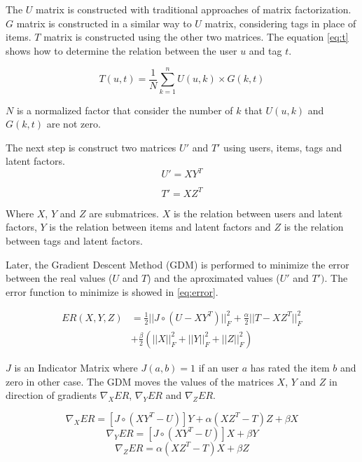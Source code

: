 \documentclass{sig-alternate}
\begin{document}
The $U$ matrix is constructed with traditional approaches of matrix factorization. $G$ matrix is constructed in a similar way to $U$ matrix, considering tags in place of items. $T$ matrix is constructed using the other two matrices. The equation \eqref{eq:t} shows how to determine the relation between the user $u$ and tag $t$.

\begin{equation}
\label{eq:t}
T(u,t) = \frac{1}{N} \sum_{k=1}^{n}U(u,k) \times G(k,t)
\end{equation}

$N$ is a normalized factor that consider the number of $k$ that $U(u,k)$ and $G(k,t)$ are not zero.

The next step is construct two matrices $U'$ and $T'$ using users, items, tags and latent factors.
\begin{equation}
\label{eq:u}
U' = XY^T
\end{equation} 

\begin{equation}
\label{eq:u}
T' = XZ^T
\end{equation} 

Where $X$, $Y$ and $Z$ are submatrices. $X$ is the relation between users and latent factors, $Y$ is the relation between items and latent factors and $Z$ is the relation between tags and latent factors.

Later, the Gradient Descent Method (GDM) is performed to minimize the error between the real values ($U$ and $T$) and the aproximated values ($U'$ and $T')$. The error function to minimize is showed in \eqref{eq:error}.

\begin{equation}
\label{eq:error}
\begin{aligned}
ER(X,Y,Z) &= \frac{1}{2}||J \circ (U-XY^T)||^{2}_{F}+\frac{\alpha}{2}||T-XZ^T||^{2}_{F}\\
&+\frac{\beta}{2}\left( ||X||^{2}_{F} + ||Y||^{2}_{F} + ||Z||^{2}_{F} \right)
\end{aligned}
\end{equation}

$J$ is an Indicator Matrix where $J(a,b)=1$ if an user $a$ has rated the item $b$ and zero in other case. The GDM moves the values of the matrices $X$, $Y$ and $Z$ in direction of gradients $\nabla_XER$, $\nabla_YER$ and $\nabla_ZER$.

\begin{equation}
\label{eq:gradientx}
\nabla_XER = \left[ J \circ (XY^T-U) \right] Y + \alpha (XZ^T-T)Z + \beta X
\end{equation}
\begin{equation}
\label{eq:gradienty}
\nabla_YER = \left[ J \circ (XY^T-U) \right] X + \beta Y
\end{equation}
\begin{equation}
\label{eq:gradientz}
\nabla_ZER = \alpha (XZ^T-T)X + \beta Z
\end{equation}
\end{document}
